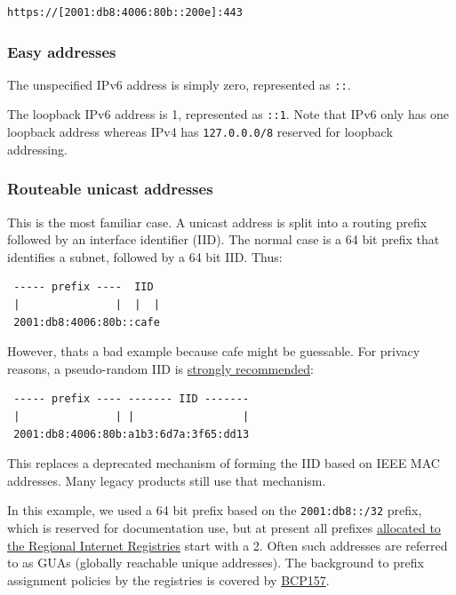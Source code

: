\documentclass[
]{article}
\begin{document}
\begin{verbatim}
https://[2001:db8:4006:80b::200e]:443
\end{verbatim}

\subsubsection{Easy addresses}\label{easy-addresses}

The unspecified IPv6 address is simply zero, represented as \texttt{::}.

The loopback IPv6 address is 1, represented as \texttt{::1}. Note that
IPv6 only has one loopback address whereas IPv4 has \texttt{127.0.0.0/8}
reserved for loopback addressing.

\subsubsection{Routeable unicast
addresses}\label{routeable-unicast-addresses}

This is the most familiar case. A unicast address is split into a
routing prefix followed by an interface identifier (IID). The normal
case is a 64 bit prefix that identifies a subnet, followed by a 64 bit
IID. Thus:

\begin{verbatim}
 ----- prefix ----  IID
 |               |  |  |
 2001:db8:4006:80b::cafe
\end{verbatim}

However, that\textquotesingle s a bad example because
\textquotesingle cafe\textquotesingle{} might be guessable. For privacy
reasons, a pseudo-random IID is
\href{https://www.rfc-editor.org/info/rfc8064}{strongly recommended}:

\begin{verbatim}
 ----- prefix ---- ------- IID -------
 |               | |                 |
 2001:db8:4006:80b:a1b3:6d7a:3f65:dd13
\end{verbatim}

This replaces a deprecated mechanism of forming the IID based on IEEE
MAC addresses. Many legacy products still use that mechanism.

In this example, we used a 64 bit prefix based on the
\texttt{2001:db8::/32} prefix, which is reserved for documentation use,
but at present all prefixes
\href{https://www.iana.org/assignments/ipv6-unicast-address-assignments/ipv6-unicast-address-assignments.xhtml}{allocated
to the Regional Internet Registries} start with a 2. Often such
addresses are referred to as GUAs (globally reachable unique addresses).
The background to prefix assignment policies by the registries is
covered by \href{https://www.rfc-editor.org/info/bcp157}{BCP157}.
\end{document}
